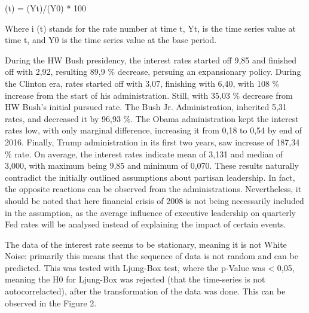 \documentclass[11pt]{article}
\begin{document}
\begin{center}
	
	\iota (t) = (Yt)/(Y0) * 100
	
\end{center}

	Where i (t) stands for the rate number at time t, Yt, is the time series value at time t, and Y0 is the time series value at the base period.
	
	During the HW Bush presidency, the interest rates started off 9,85 and finished off with 2,92, resulting 89,9 \% decrease, persuing an expansionary policy.
	During the Clinton era, rates started off with 3,07, finishing with 6,40, with 108 \% increase from the start of his administration. Still, with 35,03 \% decrease from HW Bush's initial pursued rate. The Bush Jr. Administration, inherited 5,31 rates, and decreased it by 96,93 \%. The Obama administration kept the interest rates low, with only marginal difference, increasing it from 0,18 to 0,54 by end of 2016. Finally, Trump administration in its first two years, saw increase of 187,34 \% rate.
	On average, the interest rates indicate mean of 3,131 and median of 3,000, with maximum being 9,85 and minimum of 0,070. 
	  These results naturally contradict the initially outlined assumptions about partisan leadership. In fact, the opposite reactions can be observed from the administrations. Nevertheless, it should be noted that here financial crisis of 2008 is not being necessarily included in the assumption, as the average influence of executive leadership on quarterly Fed rates will be analysed instead of explaining the impact of certain events.

The data of the interest rate seems to be stationary, meaning it is not White Noise: primarily this means that the sequence of data is not random and can be predicted. This was tested with Ljung-Box test, where the p-Value was < 0,05, meaning the H0 for Ljung-Box was rejected (that the time-series is not autocorrelacted), after the transformation of the data was done. This can be observed in the Figure 2.
\end{document}
